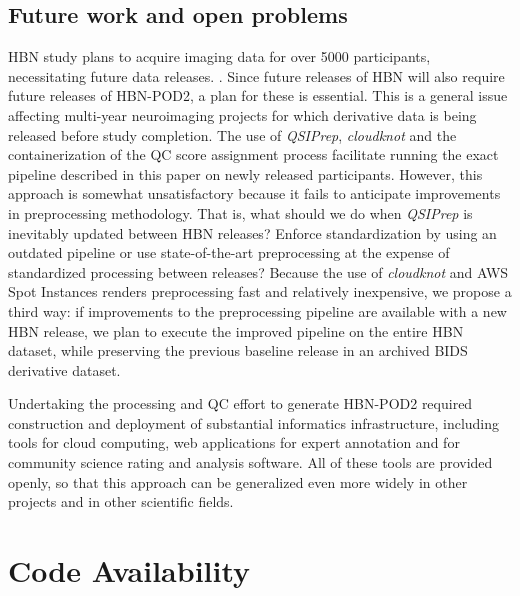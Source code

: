 \documentclass[fleqn,10pt,inline]{wlscirep}
\begin{document}
\subsection*{Future work and open problems}

 HBN study plans to acquire imaging data for over \num{5000} participants,
necessitating future data releases. . Since  future releases of HBN will also require future releases of HBN-POD2, a plan for these is essential. This is
a general issue affecting multi-year neuroimaging projects for which derivative
data is being released before study completion. The use of \emph{QSIPrep},
\emph{cloudknot} and the containerization of the QC score assignment process
facilitate running the exact pipeline described in this paper on newly released
participants. However, this approach is somewhat unsatisfactory because it fails to
anticipate improvements in preprocessing methodology. That is, what should we do
when \emph{QSIPrep} is inevitably updated between HBN releases? Enforce
standardization by using an outdated pipeline or use state-of-the-art
preprocessing at the expense of standardized processing between releases?
Because the use of \emph{cloudknot} and AWS Spot Instances renders preprocessing
fast and relatively inexpensive, we propose a third way: if improvements to the
preprocessing pipeline are available with a new HBN release, we plan to execute
the improved pipeline on the entire HBN dataset, while preserving the previous
baseline release in an archived BIDS derivative dataset.

Undertaking the processing and QC effort to generate HBN-POD2 required
construction and deployment of substantial informatics infrastructure, including
tools for cloud computing, web applications for expert annotation and for
community science rating and analysis software. All of these tools are provided
openly, so that this approach can be generalized even more widely in other
projects and in other scientific fields.

\section*{Code Availability}
\end{document}
